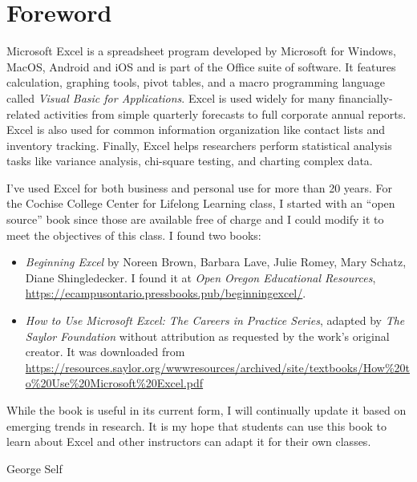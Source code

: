 \chapter*{Foreword}\label{ch:foreword}

Microsoft Excel is a spreadsheet program developed by Microsoft for Windows, MacOS, Android and iOS and is part of the Office suite of software. It features calculation, graphing tools, pivot tables, and a macro programming language called \textit{Visual Basic for Applications}. Excel is used widely for many financially-related activities from simple quarterly forecasts to full corporate annual reports. Excel is also used for common information organization like contact lists and inventory tracking. Finally, Excel helps researchers perform statistical analysis tasks like variance analysis, chi-square testing, and charting complex data.

I've used Excel for both business and personal use for more than 20 years. For the Cochise College Center for Lifelong Learning class, I started with an ``open source'' book since those are available free of charge and I could modify it to meet the objectives of this class. I found two books: 

\begin{itemize}
	\item \textit{Beginning Excel} by Noreen Brown, Barbara Lave, Julie Romey, Mary Schatz, Diane Shingledecker. I found it at \textit{Open Oregon Educational Resources}, \url{https://ecampusontario.pressbooks.pub/beginningexcel/}.

	\item \textit{How to Use Microsoft Excel: The Careers in Practice Series}, adapted by \textit{The Saylor Foundation} without attribution as requested by the work's original creator. It was downloaded from \url{https://resources.saylor.org/wwwresources/archived/site/textbooks/How%20to%20Use%20Microsoft%20Excel.pdf}
\end{itemize}

While the book is useful in its current form, I will continually update it based on emerging trends in research. It is my hope that students can use this book to learn about Excel and other instructors can adapt it for their own classes.

\bigskip
\begin{flushright}
  \textemdash \; George Self
\end{flushright}
